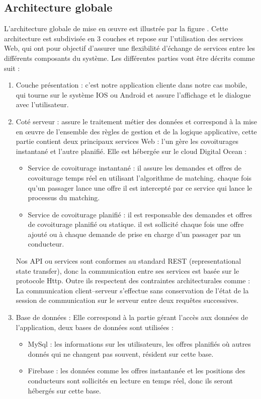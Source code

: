 \subsection{Architecture globale} %
\label{ssub:architecture_globale}
L’architecture globale de mise en œuvre est illustrée par la figure . Cette architecture est subdivisée en 3 couches et repose sur l’utilisation des services Web, qui ont pour objectif d’assurer une flexibilité d’échange de services entre les différents composants du système.\newline
Les différentes parties vont être décrits comme suit :
\begin{enumerate}
	\item Couche présentation : c'est notre application cliente dans notre cas mobile, qui tourne sur le système IOS ou Android et assure l'affichage et le dialogue avec l'utilisateur.
	\item Coté serveur : assure le traitement métier des données et correspond à la mise en œuvre de l'ensemble des règles de gestion et de la logique applicative, cette partie contient deux principaux services Web : l'un gère les covoiturages instantané et l'autre planifié. Elle est hébergée sur le cloud Digital Ocean :
	\begin{itemize}
		\item Service de covoiturage instantané : il assure les demandes et offres de covoiturage temps réel en utilisant l'algorithme de matching. chaque fois qu'un passager lance une offre il est intercepté par ce service qui lance le processus du matching. 
		\item Service de covoiturage planifié : il est responsable des demandes et offres de covoiturage planifié ou statique. il est sollicité chaque fois une offre ajouté ou à chaque demande de prise en charge d'un passager par un conducteur.
	\end{itemize}
	Nos API ou services sont conformes au standard REST (representational state transfer), donc la communication entre ses services est basée sur le protocole Http. Outre ils respectent des contraintes architecturales comme : La communication client–serveur s'effectue sans conservation de l'état de la session de communication sur le serveur entre deux requêtes successives.\cite{fielding2000architectural}
	\item Base de données : Elle correspond à la partie gérant l'accès aux données de l'application, deux bases de données sont utilisées :
	\begin{itemize}
		\item MySql : les informations sur les utilisateurs, les offres planifiés où autres donnés qui ne changent pas souvent, résident sur cette base.
		\item Firebase : les données comme les offres instantanée et les positions des conducteurs sont sollicités en lecture en temps réel, donc ils seront hébergés sur cette base.
	\end{itemize}
\end{enumerate}
